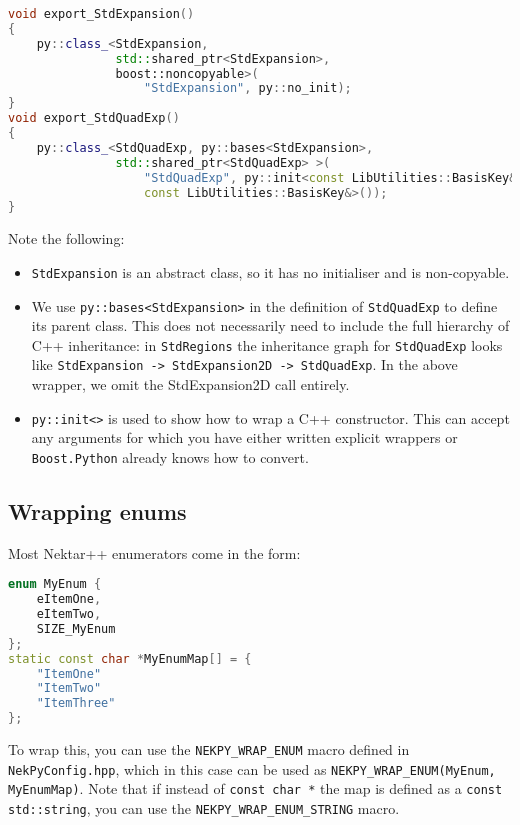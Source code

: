 \begin{lstlisting}[caption={Inheritance with Boost.Python}, label={lst:inheritance}, language=C++]
void export_StdExpansion()
{
    py::class_<StdExpansion,
               std::shared_ptr<StdExpansion>,
               boost::noncopyable>(
                   "StdExpansion", py::no_init);
}
void export_StdQuadExp()
{
    py::class_<StdQuadExp, py::bases<StdExpansion>,
               std::shared_ptr<StdQuadExp> >(
                   "StdQuadExp", py::init<const LibUtilities::BasisKey&,
                   const LibUtilities::BasisKey&>());
}
\end{lstlisting}

Note the following:

\begin{itemize}
	\item \texttt{StdExpansion} is an abstract class, so it has no initialiser and is
  		non-copyable.
  	\item We use \texttt{py::bases<StdExpansion>} in the definition of \texttt{StdQuadExp} 
  		to define its parent class. This does not necessarily need to include the full hierarchy
  		of C++ inheritance: in \texttt{StdRegions} the inheritance graph for \texttt{StdQuadExp}
  		looks like \texttt{StdExpansion -> StdExpansion2D -> StdQuadExp}. In the above wrapper, 
  		we omit the StdExpansion2D call entirely.
	\item \texttt{py::init<>} is used to show how to wrap a C++ constructor. This can accept
  		any arguments for which you have either written explicit wrappers or
  		\texttt{Boost.Python} already knows how to convert.
\end{itemize}

\subsection{Wrapping enums}

Most Nektar++ enumerators come in the form:

\begin{lstlisting}[language=C++]
enum MyEnum {
    eItemOne,
    eItemTwo,
    SIZE_MyEnum
};
static const char *MyEnumMap[] = {
    "ItemOne"
    "ItemTwo"
    "ItemThree"
};
\end{lstlisting}

To wrap this, you can use the \texttt{NEKPY\_WRAP\_ENUM} macro defined in
\texttt{NekPyConfig.hpp}, which in this case can be used as 
\texttt{NEKPY\_WRAP\_ENUM(MyEnum, MyEnumMap)}. Note that if instead of 
\texttt{const char *} the map is defined as a \texttt{const std::string}, 
you can use the \texttt{NEKPY\_WRAP\_ENUM\_STRING} macro.
